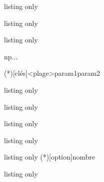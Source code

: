 \begin{PresCodeTexPL}{listing only}
\pflnormgraph
\pflexpograph
\end{PresCodeTexPL}

\begin{PresCodeTexPL}{listing only}
\end{PresCodeTexPL}

\begin{PresCodeTexPL}{listing only}
\pflhistobinom

\begin{HistoBinomiale}[clés]{n}{p}...\end{HistoBinomiale}

\TraceLoiNormale(*)[clés]<plage>{param1}{param2}
\end{PresCodeTexPL}

\begin{PresCodeTexPL}{listing only}
\pflnbalea
\end{PresCodeTexPL}

\begin{PresCodeTexPL}{listing only}
\end{PresCodeTexPL}

\begin{PresCodeTexPL}{listing only}
\pflvarnbalea
\end{PresCodeTexPL}

\begin{PresCodeTexPL}{listing only}
\pfltiragealeaent
\end{PresCodeTexPL}

\begin{PresCodeTexPL}{listing only}
\ListeDiviseurs(*)[option]{nombre}
\pfllistediv
\end{PresCodeTexPL}

\begin{PresCodeTexPL}{listing only}
\pflarbrediv
\end{PresCodeTexPL}

